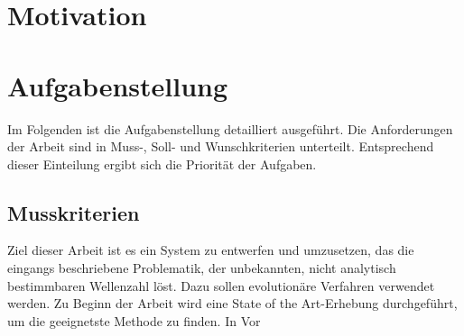 \documentclass[a4paper,12pt,fleqn]{article}
\begin{document}

\setlength{\headheight}{36pt}

\begin{titlepage}



\end{titlepage}

\begin{abstract}

\end{abstract}

\tableofcontents
\newpage

\section{Motivation}


\section{Aufgabenstellung}
Im Folgenden ist die Aufgabenstellung detailliert ausgeführt. Die Anforderungen der Arbeit sind in Muss-, Soll- und Wunschkriterien unterteilt. Entsprechend dieser Einteilung ergibt sich die Priorität der Aufgaben.
\subsection{Musskriterien}
Ziel dieser Arbeit ist es ein System zu entwerfen und umzusetzen, das die eingangs beschriebene Problematik, der unbekannten, nicht analytisch bestimmbaren Wellenzahl löst. Dazu sollen evolutionäre Verfahren verwendet werden. Zu Beginn der Arbeit wird eine State of the Art-Erhebung durchgeführt, um die geeignetste Methode zu finden. In Vor
\end{document}
